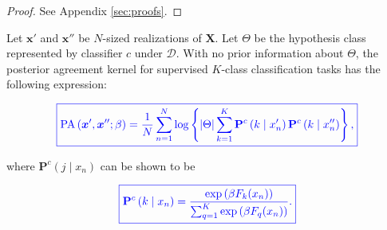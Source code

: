 \begin{proof}
    See Appendix \ref{sec:proofs}.
\end{proof}

\begin{theorem}
    Let $\bm{x}'$ and $\bm{x}''$ be $N$-sized realizations of $\bm{X}$.
    Let $\Theta$ be the hypothesis class represented by classifier $c$ under $\mathcal{D}$.
    With no prior information about $\Theta$, the posterior agreement kernel
    for supervised $K$-class classification tasks has the following expression:

    $$
    \textcolor{blue}{
        \boxed{
            \operatorname{PA}\left(\bm{x}', \bm{x}'' ; \beta\right)=\frac{1}{N} \sum_{n=1}^N \log \left\{|\Theta| \sum_{k= 1}^K \mathbf{P}^c\left(k \mid x_n' \right) \mathbf{P}^c \left( k \mid x_n'' \right)\right\},
        }
    }
    $$

    where $\mathbf{P}^c(j \mid x_n)$ can be shown to be

    $$
    \textcolor{blue}{
        \boxed{
            \mathbf{P}^c\left(k \mid x_n\right)=\frac{\exp\left(\beta F_{k}(x_n)\right)}{\sum_{q=1}^K\exp\left(\beta F_q(x_n)\right)}.
        }
    }
    $$
\end{theorem}

